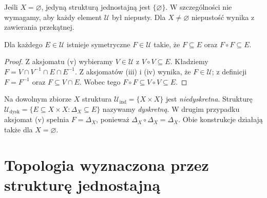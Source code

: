 \begin{uwaga}
Jeśli $X=\varnothing$, jedyną strukturą jednostajną jest
$\{\varnothing\}$. W szczególności nie wymagamy, aby każdy
element $\mathcal U$ był niepusty. Dla $X\ne\varnothing$
niepustość wynika z zawierania przekątnej.
\end{uwaga}

\begin{lemat}
\label{lem:topog-jednostajne-symetryczne}
Dla każdego $E\in\mathcal U$ istnieje symetryczne
$F\in\mathcal U$ takie, że $F\subseteq E$ oraz
$F\circ F\subseteq E$.
\end{lemat}
\begin{proof}
Z aksjomatu (v) wybieramy $V\in\mathcal U$
z $V\circ V\subseteq E$. Kładziemy
$F=V\cap V^{-1}\cap E\cap E^{-1}$.
Z aksjomatów (iii) i (iv) wynika, że $F\in\mathcal U$;
z definicji $F=F^{-1}$ oraz $F\subseteq V\cap E$.
Wobec tego $F\circ F\subseteq V\circ V\subseteq E$.
\end{proof}

\begin{przyklad}
\label{ex:topog-jednostajne-skrajne}
Na dowolnym zbiorze $X$ struktura
$\mathcal U_{\mathrm{ind}}=\{X\times X\}$ jest
\emph{niedyskretna}. Strukturę
$\mathcal U_{\mathrm{dysk}}=
\{E\subseteq X\times X:\Delta_X\subseteq E\}$
nazywamy \emph{dyskretną}. W drugim przypadku
aksjomat (v) spełnia $F=\Delta_X$, ponieważ
$\Delta_X\circ\Delta_X=\Delta_X$.
Obie konstrukcje działają także dla $X=\varnothing$.
\end{przyklad}

\section{Topologia wyznaczona przez strukturę jednostajną}
\label{sec:topog-jednostajne-topologia}

